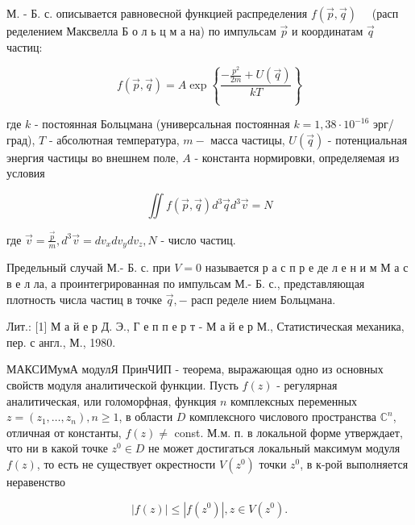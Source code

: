 \documentclass[10pt]{article}
\begin{document}
М. - Б. с. описывается равновесной функцией распределения $f(\vec{p}, \vec{q}) \quad$ (расп ределением Максвелла Б о л ь ц м а на) по импульсам $\vec{p}$ и координатам $\vec{q}$ частиц:



\[

f(\vec{p}, \vec{q})=A \exp \left\{\frac{-\frac{p^{2}}{2 m}+U(\vec{q})}{k T}\right\}

\]



где $k$ - постоянная Больцмана (универсальная постоянная $k=1,38 \cdot 10^{-16}$ эрг/град), $T$ - абсолютная температура, $m-$ масса частицы, $U(\vec{q})$ - потенциальная энергия частицы во внешнем поле, $A$ - константа нормировки, определяемая из условия



\[

\iint f(\vec{p}, \vec{q}) d^{3} \vec{q} d^{3} \vec{v}=N

\]



где $\vec{v}=\frac{\vec{p}}{m}, d^{3} \vec{v}=d v_{x} d v_{y} d v_{z}, N$ - число частиц.



Предельный случай М.- Б. с. при $V=0$ называется р а с п р е де л е н и м М а с в е л ла, а проинтегрированная по импульсам М.- Б. с., представляющая плотность числа частиц в точке $\vec{q},-$ расп ределе нием Больцмана.



Лит.: [1] М а й е р Д. Э., Г е п п е р т - М а й е р М., Статистическая механика, пер. с англ., М., 1980.



МАКСИМумА модулЯ ПринЧИП - теорема, выражающая одно из основных свойств модуля аналитической функции. Пусть $f(z)$ - регулярная аналитическая, или голоморфная, функция $n$ комплексных переменных $z=\left(z_{1}, \ldots, z_{n}\right), n \geqslant 1$, в области $D$ комплексного числового пространства $\mathbb{C}^{n}$, отличная от константы, $f(z) \neq$ const. М.м. п. в локальной форме утверждает, что ни в какой точке $z^{0} \in D$ не может достигаться локальный максимум модуля $f(z)$, то есть не существует окрестности $V\left(z^{0}\right)$ точки $z^{0}$, в к-рой выполняется неравенство



\[

|f(z)| \leqslant\left|f\left(z^{0}\right)\right|, z \in V\left(z^{0}\right) .

\]
\end{document}
